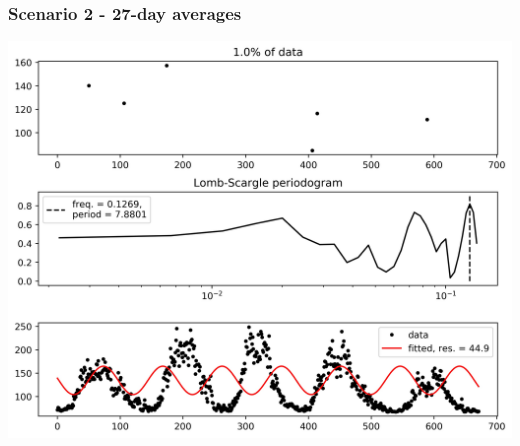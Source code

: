 \documentclass{beamer}
\begin{document}
\begin{frame}
\frametitle{Scenario 2 - 27-day averages}
\begin{center}
\includegraphics[scale=0.55]{../scripts/dataset2/periodograms_ny2.0_model1_pg0.99.jpg}
\end{center}
\end{frame}
\end{document}
